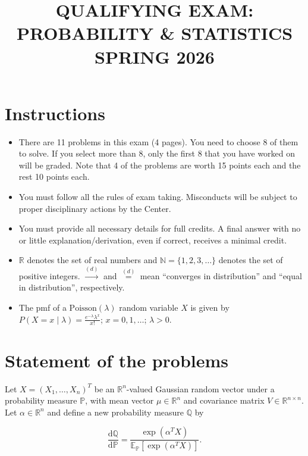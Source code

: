 \documentclass[11pt,a4paper]{article}
\title{\textbf{QUALIFYING EXAM: PROBABILITY \& STATISTICS}\\[0.5em]\Large SPRING 2026}
\date{}
\author{}
\newcommand{\examstatement}[1]{%
  \par\addvspace{0.85em}%
  \noindent{\bfseries #1}\par\nobreak\addvspace{0.28em}%
}
\begin{document}
\maketitle
\vspace{-3em}

\tableofcontents

\section{Instructions}
\begin{itemize}
    \item There are 11 problems in this exam (4 pages). You need to choose 8 of them to solve. If you select more than 8, only the first 8 that you have worked on will be graded. Note that 4 of the problems are worth 15 points each and the rest 10 points each.
    \item You must follow all the rules of exam taking. Misconducts will be subject to proper disciplinary actions by the Center.
    \item You must provide all necessary details for full credits. A final answer with no or little explanation/derivation, even if correct, receives a minimal credit.
    \item \( \mathbb{R} \) denotes the set of real numbers and \( \mathbb{N} = \{1, 2, 3, \dots\} \) denotes the set of positive integers. \( \xrightarrow{(d)} \) and \( \stackrel{(d)}{=} \) mean ``converges in distribution'' and ``equal in distribution'', respectively.
    \item The pmf of a \( \mathrm{Poisson}(\lambda) \) random variable \( X \) is given by \( P(X = x \mid \lambda) = \frac{e^{-\lambda} \lambda^x}{x!} \); \( x = 0, 1, \dots \); \( \lambda > 0 \).
\end{itemize}

\section{Statement of the problems}

\examstatement{Problem 1. [10 pts.]}
Let \( X = (X_1, \dots, X_n)^T \) be an \( \mathbb{R}^n \)-valued Gaussian random vector under a probability measure \( \mathbb{P} \), with mean vector \( \mu \in \mathbb{R}^n \) and covariance matrix \( V \in \mathbb{R}^{n \times n} \). Let \( \alpha \in \mathbb{R}^n \) and define a new probability measure \( \mathbb{Q} \) by

\[
\frac{\mathrm{d}\mathbb{Q}}{\mathrm{d}\mathbb{P}} = \frac{\exp(\alpha^T X)}{\mathbb{E}_{\mathbb{P}}[\exp(\alpha^T X)]}.
\]
\end{document}
